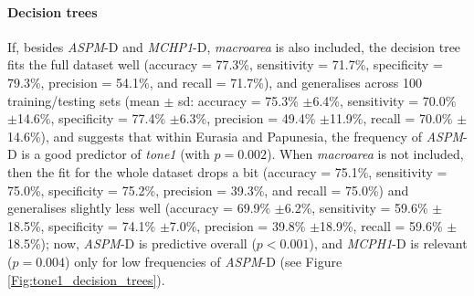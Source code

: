 \documentclass[twoside,onecolumn]{article}
\begin{document}
\paragraph{Decision trees}

If, besides \textit{ASPM}-D and \textit{MCHP1}-D, \textit{macroarea} is also included, the decision tree fits the full dataset well (accuracy = 77.3\%, sensitivity = 71.7\%, specificity = 79.3\%, precision = 54.1\%, and recall = 71.7\%), and generalises across 100 training/testing sets (mean $\pm$ sd: accuracy = 75.3\% $\pm$6.4\%, sensitivity = 70.0\% $\pm$14.6\%, specificity = 77.4\% $\pm$6.3\%, precision = 49.4\% $\pm$11.9\%, recall = 70.0\% $\pm$14.6\%), and suggests that within Eurasia and Papunesia, the frequency of \textit{ASPM}-D is a good predictor of \textit{tone1} (with $p = 0.002$).
When \textit{macroarea} is not included, then the fit for the whole dataset drops a bit (accuracy = 75.1\%, sensitivity = 75.0\%, specificity = 75.2\%, precision = 39.3\%, and recall = 75.0\%) and generalises slightly less well (accuracy = 69.9\% $\pm$6.2\%, sensitivity = 59.6\% $\pm$18.5\%, specificity = 74.1\% $\pm$7.0\%, precision = 39.8\% $\pm$18.9\%, recall = 59.6\% $\pm$18.5\%); now, \textit{ASPM}-D is predictive overall ($p < 0.001$), and \textit{MCPH1}-D is relevant ($p = 0.004$) only for low frequencies of \textit{ASPM}-D (see Figure \ref{Fig:tone1_decision_trees}).
\end{document}
